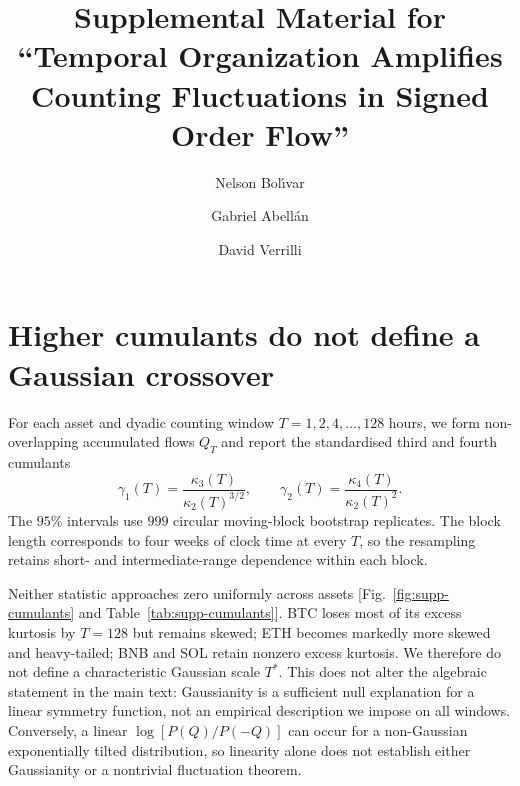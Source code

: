 \documentclass[aps,pre,onecolumn,superscriptaddress,floatfix,nofootinbib]{revtex4-2}
\begin{document}
\title{Supplemental Material for ``Temporal Organization Amplifies Counting
Fluctuations in Signed Order Flow''}

\author{Nelson Bol\'{\i}var}
\author{Gabriel Abell\'an}
\author{David Verrilli}

\maketitle

\section{Higher cumulants do not define a Gaussian crossover}

For each asset and dyadic counting window $T=1,2,4,\ldots,128$ hours, we form
non-overlapping accumulated flows $Q_T$ and report the standardised third and
fourth cumulants
\begin{equation}
 \gamma_1(T)=\frac{\kappa_3(T)}{\kappa_2(T)^{3/2}},\qquad
 \gamma_2(T)=\frac{\kappa_4(T)}{\kappa_2(T)^2}.
\end{equation}
The $95\%$ intervals use $999$ circular moving-block bootstrap replicates. The
block length corresponds to four weeks of clock time at every $T$, so the
resampling retains short- and intermediate-range dependence within each block.

Neither statistic approaches zero uniformly across assets
[Fig.~\ref{fig:supp-cumulants} and Table~\ref{tab:supp-cumulants}]. BTC loses
most of its excess kurtosis by $T=128$ but remains skewed; ETH becomes markedly
more skewed and heavy-tailed; BNB and SOL retain nonzero excess kurtosis. We
therefore do not define a characteristic Gaussian scale $T^*$. This does not
alter the algebraic statement in the main text: Gaussianity is a sufficient null
explanation for a linear symmetry function, not an empirical description we
impose on all windows. Conversely, a linear $\log[P(Q)/P(-Q)]$ can occur for a
non-Gaussian exponentially tilted distribution, so linearity alone does not
establish either Gaussianity or a nontrivial fluctuation theorem.
\end{document}
